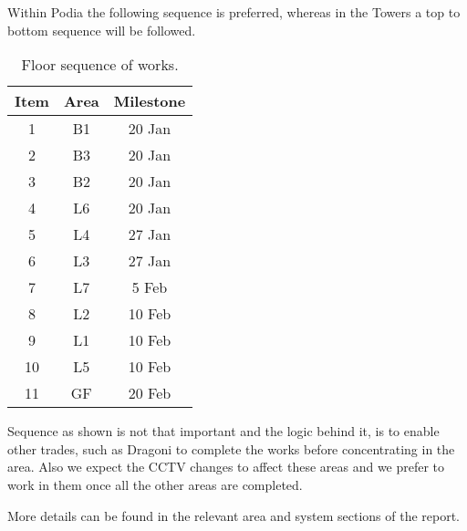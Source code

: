 Within Podia the following sequence is preferred, whereas in the Towers a top to bottom sequence will be followed.

\begin{table}[htbp]
\centering
\begin{tabular}{ccc}
\toprule
Item  &Area   & Milestone \\
\midrule
1     & B1 & 20 Jan\\
2     & B3 & 20 Jan \\
3     & B2 & 20 Jan \\
4     & L6 & 20 Jan\\
5     & L4 & 27 Jan\\
6     & L3 & 27 Jan\\
7     & L7 &  5 Feb\\
8     & L2 & 10 Feb\\
9     & L1 & 10 Feb\\
10    & L5 & 10 Feb\\
11    & GF & 20 Feb\\
\bottomrule
\end{tabular}
\caption{Floor sequence of works.}
\end{table}

Sequence as shown is not that important and the logic behind it, is to enable other trades, such as Dragoni to complete the
works before concentrating in the area. Also we expect the CCTV
changes to affect these areas and we prefer to work in them
once all the other areas are completed.

More details can be found in the relevant area and system sections of the report.

